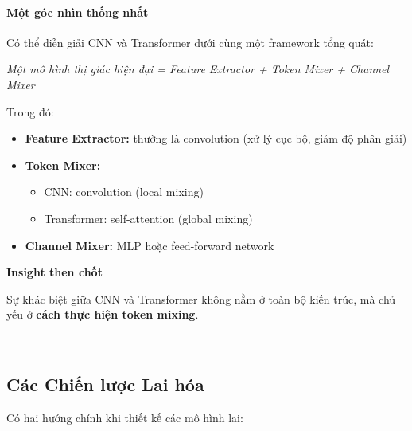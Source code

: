 \paragraph{Một góc nhìn thống nhất}

Có thể diễn giải CNN và Transformer dưới cùng một framework tổng quát:

\begin{center}
	\textit{Một mô hình thị giác hiện đại = Feature Extractor + Token Mixer + Channel Mixer}
\end{center}

Trong đó:
\begin{itemize}
	\item \textbf{Feature Extractor:} thường là convolution (xử lý cục bộ, giảm độ phân giải)
	\item \textbf{Token Mixer:} 
	\begin{itemize}
		\item CNN: convolution (local mixing)
		\item Transformer: self-attention (global mixing)
	\end{itemize}
	\item \textbf{Channel Mixer:} MLP hoặc feed-forward network
\end{itemize}

\begin{mdframed}[style=infobox]
	\textbf{Insight then chốt}
	
	Sự khác biệt giữa CNN và Transformer không nằm ở toàn bộ kiến trúc,  
	mà chủ yếu ở \textbf{cách thực hiện token mixing}.
\end{mdframed}

---

\subsection{Các Chiến lược Lai hóa}
\label{subsec:hybrid_strategies}

Có hai hướng chính khi thiết kế các mô hình lai:

